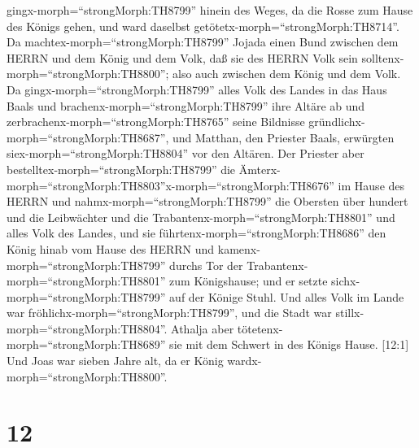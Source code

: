 gingx-morph=``strongMorph:TH8799'' hinein des Weges, da die Rosse zum
Hause des Königs gehen, und ward daselbst
getötetx-morph=``strongMorph:TH8714''.  Da
machtex-morph=``strongMorph:TH8799'' Jojada einen Bund zwischen dem
HERRN und dem König und dem Volk, daß sie des HERRN Volk sein
solltenx-morph=``strongMorph:TH8800''; also auch zwischen dem König und
dem Volk.  Da gingx-morph=``strongMorph:TH8799'' alles Volk
des Landes in das Haus Baals und brachenx-morph=``strongMorph:TH8799''
ihre Altäre ab und zerbrachenx-morph=``strongMorph:TH8765'' seine
Bildnisse gründlichx-morph=``strongMorph:TH8687'', und Matthan, den
Priester Baals, erwürgten siex-morph=``strongMorph:TH8804'' vor den
Altären. Der Priester aber bestelltex-morph=``strongMorph:TH8799'' die
Ämterx-morph=``strongMorph:TH8803''\textbar x-morph=``strongMorph:TH8676''
im Hause des HERRN  und nahmx-morph=``strongMorph:TH8799''
die Obersten über hundert und die Leibwächter und die
Trabantenx-morph=``strongMorph:TH8801'' und alles Volk des Landes, und
sie führtenx-morph=``strongMorph:TH8686'' den König hinab vom Hause des
HERRN und kamenx-morph=``strongMorph:TH8799'' durchs Tor der
Trabantenx-morph=``strongMorph:TH8801'' zum Königshause; und er setzte
sichx-morph=``strongMorph:TH8799'' auf der Könige Stuhl. 
Und alles Volk im Lande war fröhlichx-morph=``strongMorph:TH8799'', und
die Stadt war stillx-morph=``strongMorph:TH8804''. Athalja aber
tötetenx-morph=``strongMorph:TH8689'' sie mit dem Schwert in des Königs
Hause.  {[}12:1{]} Und Joas war sieben Jahre alt, da er
König wardx-morph=``strongMorph:TH8800''.

\hypertarget{section-11}{%
\section{12}\label{section-11}}

